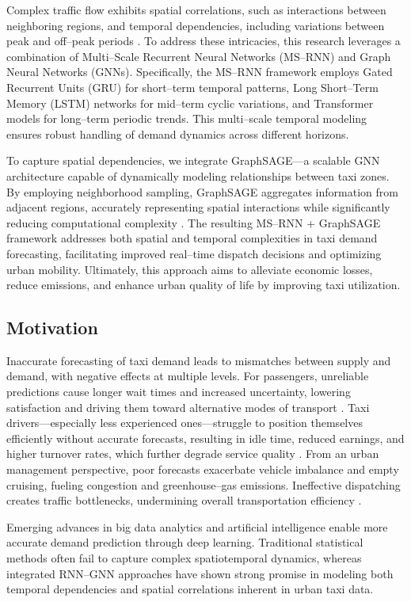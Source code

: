 \documentclass{article}
\begin{document}
Complex traffic flow exhibits spatial correlations, such as interactions between neighboring regions, and temporal dependencies, including variations between peak and off–peak periods \cite{xue_2020_spatialtemporal}. To address these intricacies, this research leverages a combination of Multi–Scale Recurrent Neural Networks (MS–RNN) and Graph Neural Networks (GNNs). Specifically, the MS–RNN framework employs Gated Recurrent Units (GRU) for short–term temporal patterns, Long Short–Term Memory (LSTM) networks for mid–term cyclic variations, and Transformer models for long–term periodic trends. This multi–scale temporal modeling ensures robust handling of demand dynamics across different horizons.

To capture spatial dependencies, we integrate GraphSAGE—a scalable GNN architecture capable of dynamically modeling relationships between taxi zones. By employing neighborhood sampling, GraphSAGE aggregates information from adjacent regions, accurately representing spatial interactions while significantly reducing computational complexity \cite{liu_2023_graphsagebased}. The resulting MS–RNN + GraphSAGE framework addresses both spatial and temporal complexities in taxi demand forecasting, facilitating improved real–time dispatch decisions and optimizing urban mobility. Ultimately, this approach aims to alleviate economic losses, reduce emissions, and enhance urban quality of life by improving taxi utilization.

\subsection{Motivation}
Inaccurate forecasting of taxi demand leads to mismatches between supply and demand, with negative effects at multiple levels. For passengers, unreliable predictions cause longer wait times and increased uncertainty, lowering satisfaction and driving them toward alternative modes of transport \cite{zhao_2020_predicting}. Taxi drivers—especially less experienced ones—struggle to position themselves efficiently without accurate forecasts, resulting in idle time, reduced earnings, and higher turnover rates, which further degrade service quality \cite{zhao_2020_predicting}. From an urban management perspective, poor forecasts exacerbate vehicle imbalance and empty cruising, fueling congestion and greenhouse–gas emissions. Ineffective dispatching creates traffic bottlenecks, undermining overall transportation efficiency \cite{zhao_2020_predicting}. 

Emerging advances in big data analytics and artificial intelligence enable more accurate demand prediction through deep learning. Traditional statistical methods often fail to capture complex spatiotemporal dynamics, whereas integrated RNN–GNN approaches have shown strong promise in modeling both temporal dependencies and spatial correlations inherent in urban taxi data.
\end{document}
